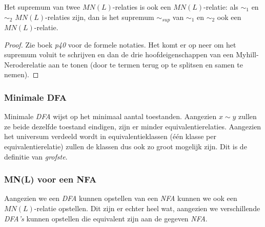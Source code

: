 \begin{theorem}
  Het supremum van twee $MN(L)$-relaties is ook een $MN(L)$-relatie: als $\sim_1$ en $\sim_2$ $MN(L)$-relaties zijn, dan is het supremum $\sim_{sup}$ van $\sim_1$ en $\sim_2$ ook een $MN(L)$-relatie.
\end{theorem}

\begin{proof}
  Zie boek \emph{p40} voor de formele notaties. Het komt er op neer om het supremum voluit te schrijven en dan de drie hoofdeigenschappen van een Myhill-Neroderelatie aan te tonen (door te termen terug op te splitsen en samen te nemen).
\end{proof}

\subsubsection*{Minimale DFA}

Minimale \emph{DFA} wijst op het minimaal aantal toestanden. Aangezien $x \sim y$ zullen ze beide dezelfde toestand eindigen, zijn er minder equivalentierelaties. Aangezien het universum verdeeld wordt in equivalentieklassen (\'e\'en klasse per equivalentierelatie) zullen de klassen dus ook zo groot mogelijk zijn. Dit is de definitie van \emph{grofste}.

\subsubsection*{MN(L) voor een NFA}

Aangezien we een \emph{DFA} kunnen opstellen van een \emph{NFA} kunnen we ook een $MN(L)$-relatie opstellen. Dit zijn er echter heel wat, aangezien we verschillende \emph{DFA's} kunnen opstellen die equivalent zijn aan de gegeven \emph{NFA}.
